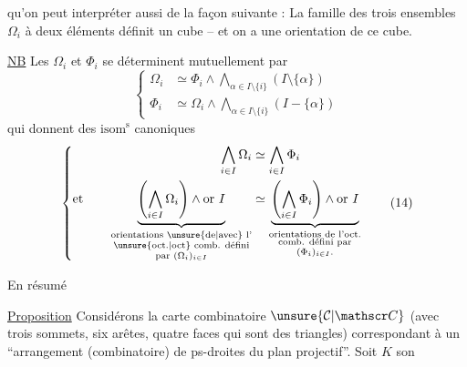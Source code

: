 qu'on peut interpréter aussi de la façon suivante : La famille  des trois ensembles $\Omega_i$ à deux éléments définit un cube -- et on a une orientation de ce cube.

\uline{NB} Les $\Omega_i$ et $\Phi_i$ se déterminent mutuellement par
\[
\left\{\begin{aligned}
 \Omega_i&\simeq\Phi_i\wedge\bigwedge_{\alpha\in I\setminus\{i\}}(I\setminus\{\alpha\})\\
 \Phi_i&\simeq\Omega_i\wedge\bigwedge_{\alpha\in I\setminus\{i\}}(I-\{\alpha\})
\end{aligned}\right.\tag*{(13)}
\]
qui donnent des $\mathrm{isom}^{\mathrm s}$ canoniques
\[
\left\{\begin{aligned}
 \bigwedge_{i\in I}\Omega_i&\simeq\bigwedge_{i\in I}\Phi_i\\
 \text{et}\qquad
 \underbrace{\left(\bigwedge_{i\in I}\Omega_i\right)\wedge\operatorname{or}\,I}
 _{\substack{\text{orientations \unsure{de|avec} l'}\\\text{\unsure{oct.|oct} comb. défini}\\\text{par }(\Omega_i)_{i\in I}}}
 &\simeq
 \underbrace{\left(\bigwedge_{i\in I}\Phi_i\right)\wedge\operatorname{or}\,I}
 _{\substack{\text{orientations de l'oct.}\\\text{comb. défini par}\\(\Phi_i)_{i\in I}.}}
\end{aligned}\right.\tag*{(14)}
\]

En résumé

\uline{Proposition} Considérons la carte combinatoire $\unsure{\mathcal C|\mathscr C}$ (avec trois sommets, six arêtes, quatre faces qui sont des triangles) correspondant à un ``arrangement (combinatoire) de   ps-droites  du plan projectif''. Soit $K$ son
